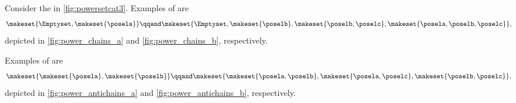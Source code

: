 \begin{example}
    Consider the  in \cref{fig:powersetcat3}.
    Examples of  are
    \begin{equation}\label{eq:example-chain}
        \makeset{\Emptyset,\makeset{\posela}}
        \qqand
        \makeset{\Emptyset,\makeset{\poselb},\makeset{\poselb,\poselc},\makeset{\posela,\poselb,\poselc}},
    \end{equation}
    depicted in \cref{fig:power_chains_a} and \cref{fig:power_chains_b}, respectively.

    Examples of  are
    \begin{equation}\label{eq:examples-antichain}
        \makeset{\makeset{\posela},\makeset{\poselb}}
        \qqand
        \makeset{\makeset{\posela,\poselb}, \makeset{\posela,\poselc}, \makeset{\poselb,\poselc}},
    \end{equation}
    depicted in \cref{fig:power_antichains_a} and \cref{fig:power_antichains_b}, respectively.
\end{example}

\begin{marginfigure}



    \caption{Examples of  (a-b) and  (c-d) in the  $\powerset\makeset{\posela,\poselb,\poselc}$.}
\end{marginfigure}

\clearpage

